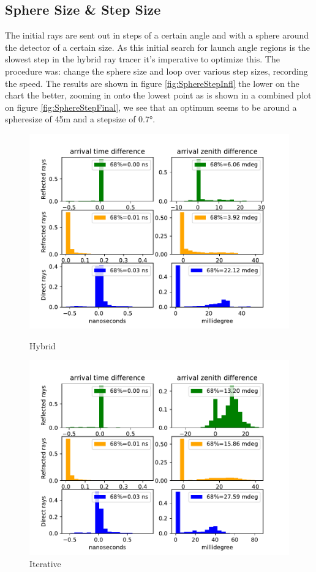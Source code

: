 \documentclass[11pt,a4paper,faculty=we,language=en,doctype=report]{cls/ugent-doc}
\begin{document}
\subsection{Sphere Size \& Step Size}
The initial rays are sent out in steps of a certain angle and with a sphere
around the detector of a certain size. As this initial search for launch angle
regions is the slowest step in the hybrid ray tracer it's imperative to
optimize this. The procedure was: change the sphere size and loop over various
step sizes, recording the speed. The results are shown in figure \ref{fig:SphereStepInfl} 
the lower on the chart the better, zooming in onto the lowest point as is shown in a combined
plot on figure \ref{fig:SphereStepFinal}, we see that an optimum seems to be around a spheresize
of 45m and a stepsize of 0.7°.

\begin{figure}
	\centering
\begin{minipage}{0.49\textwidth}
	\includegraphics[width=1.1\textwidth]{figures/hybrid_comparison_N_1000.pdf}
	\caption{Hybrid}
	\label{fig:acchyb}
\end{minipage}
\begin{minipage}{0.49\textwidth}
	\includegraphics[width=1.1\textwidth]{figures/iterative_comparison_N_1000.pdf}
	\caption{Iterative}
	\label{fig:accit}
\end{minipage}
\end{figure}
\end{document}
